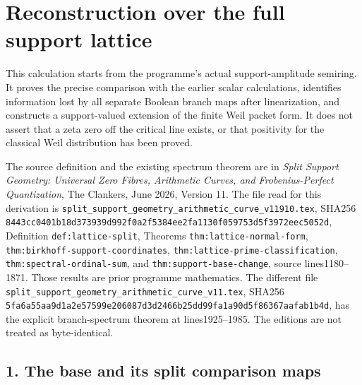 \documentclass[
  10pt,
  a4paper,
]{article}
\author{}
\date{}
\begin{document}
{
\setcounter{tocdepth}{3}
\tableofcontents
}
\section{Reconstruction over the full support
lattice}\label{reconstruction-over-the-full-support-lattice}

This calculation starts from the programme's actual support-amplitude
semiring. It proves the precise comparison with the earlier scalar
calculations, identifies information lost by all separate Boolean branch
maps after linearization, and constructs a support-valued extension of
the finite Weil packet form. It does not assert that a zeta zero off the
critical line exists, or that positivity for the classical Weil
distribution has been proved.

The source definition and the existing spectrum theorem are in
\emph{Split Support Geometry: Universal Zero Fibres, Arithmetic Curves,
and Frobenius-Perfect Quantization}, The Clankers, June 2026, Version
11. The file read for this derivation is
\texttt{split\_\allowbreak{}support\_\allowbreak{}geometry\_\allowbreak{}arithmetic\_\allowbreak{}curve\_\allowbreak{}v11910.\allowbreak{}tex}, SHA256
\texttt{8443cc04\allowbreak{}01b18d37\allowbreak{}3939d992\allowbreak{}f0a2f538\allowbreak{}4ee2fa11\allowbreak{}30f05975\allowbreak{}3d5f3972\allowbreak{}eec5052d},
Definition \texttt{def:\allowbreak{}lattice-\allowbreak{}split}, Theorems
\texttt{thm:\allowbreak{}lattice-\allowbreak{}normal-\allowbreak{}form},
\texttt{thm:\allowbreak{}birkhoff-\allowbreak{}support-\allowbreak{}coordinates},
\texttt{thm:\allowbreak{}lattice-\allowbreak{}prime-\allowbreak{}classification},
\texttt{thm:\allowbreak{}spectral-\allowbreak{}ordinal-\allowbreak{}sum}, and \texttt{thm:\allowbreak{}support-\allowbreak{}base-\allowbreak{}change},
source lines1180--1871. Those results are prior programme mathematics.
The different file
\texttt{split\_\allowbreak{}support\_\allowbreak{}geometry\_\allowbreak{}arithmetic\_\allowbreak{}curve\_\allowbreak{}v11.\allowbreak{}tex}, SHA256
\texttt{5fa6a55a\allowbreak{}a9d1a2e5\allowbreak{}7599e206\allowbreak{}087d3d24\allowbreak{}66b25dd9\allowbreak{}9fa1a90d\allowbreak{}5f86367a\allowbreak{}afab1b4d},
has the explicit branch-spectrum theorem at lines1925--1985. The
editions are not treated as byte-identical.

\subsection{1. The base and its split comparison
maps}\label{the-base-and-its-split-comparison-maps}
\end{document}
